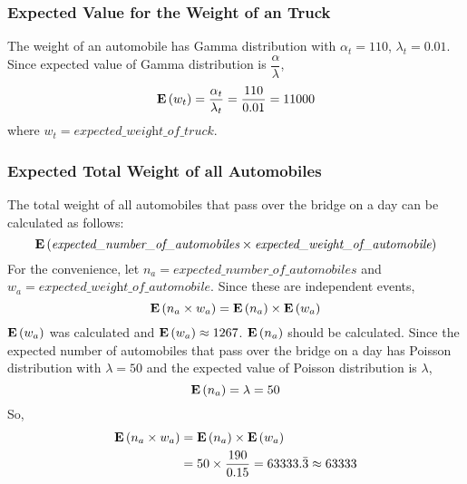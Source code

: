 \subsubsection*{Expected Value for the Weight of an Truck}


The weight of an automobile has Gamma distribution with $\alpha_t = 110$, $\lambda_t = 0.01$. Since expected value of Gamma distribution is $\dfrac{\alpha}{\lambda}$,
\begin{equation*}
  \mathbf{E}\left(w_t\right) = \frac{\alpha_t}{\lambda_t} = \frac{110}{0.01} = 11000
\end{equation*}
where $w_t = \textit{expected\_weight\_of\_truck}$.

\newpage

\subsubsection*{Expected Total Weight of all Automobiles}


The total weight of all automobiles that pass over the bridge on a day can be calculated as follows:
\begin{equation*}
  \mathbf{E}\left( \textit{expected\_number\_of\_automobiles} \times \textit{expected\_weight\_of\_automobile} \right)
\end{equation*}
For the convenience, let $n_a = \textit{expected\_number\_of\_automobiles}$ and $w_a = \textit{expected\_weight\_of\_automobile}$. Since these are independent events,
\begin{equation*}
  \mathbf{E}\left( n_a \times w_a \right) = \mathbf{E}\left(n_a\right) \times \mathbf{E}\left(w_a\right)
\end{equation*}
$\mathbf{E}\left(w_a\right)$ was calculated and $\mathbf{E}\left(w_a\right) \approx 1267$. $\mathbf{E}\left(n_a\right)$ should be calculated. Since the expected number of automobiles that pass over the bridge on a day has Poisson distribution with $\lambda = 50$ and the expected value of Poisson distribution is $\lambda$,
\begin{equation*}
  \mathbf{E}\left(n_a\right) = \lambda = 50
\end{equation*}
So,
\begin{align*}
  \mathbf{E}\left( n_a \times w_a \right) &= \mathbf{E}\left(n_a\right) \times \mathbf{E}\left(w_a\right) \\
                          &= 50 \times \frac{190}{0.15} = 63333.\bar{3} \approx 63333
\end{align*}

